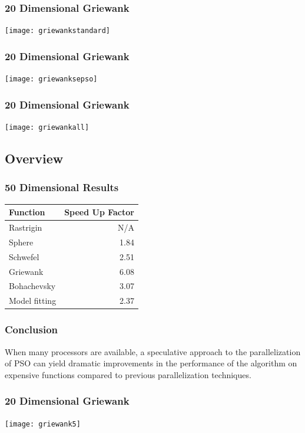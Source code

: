 \documentclass{beamer}
\begin{document}
\begin{frame}
  \frametitle{20 Dimensional Griewank}
  \begin{center}
	\texttt{[image: griewankstandard]}
  \end{center}
\end{frame}

\begin{frame}
  \frametitle{20 Dimensional Griewank}
  \begin{center}
	\texttt{[image: griewanksepso]}
  \end{center}
\end{frame}

\begin{frame}
  \frametitle{20 Dimensional Griewank}
  \begin{center}
	\texttt{[image: griewankall]}
  \end{center}
\end{frame}

\subsection{Overview}

\begin{frame}
  \frametitle{50 Dimensional Results}
  \begin{center}
	\begin{tabular}{|l|r|}
	  \hline
	  Function&Speed Up Factor\\
	  \hline
	  \hline
	  Rastrigin&N/A\\
	  \hline
	  Sphere&1.84\\
	  \hline
	  Schwefel&2.51\\
	  \hline
	  Griewank&6.08\\
	  \hline
	  Bohachevsky&3.07\\
	  \hline
	  Model fitting&2.37\\
	  \hline
	\end{tabular}
  \end{center}
\end{frame}

\begin{frame}
  \frametitle{Conclusion}
  When many processors are available, a speculative approach to the
  parallelization of PSO can yield dramatic improvements in the performance of
  the algorithm on expensive functions compared to previous parallelization
  techniques.
\end{frame}

\begin{frame}
  \frametitle{20 Dimensional Griewank}
  \begin{center}
	\texttt{[image: griewank5]}
  \end{center}
\end{frame}
\end{document}
